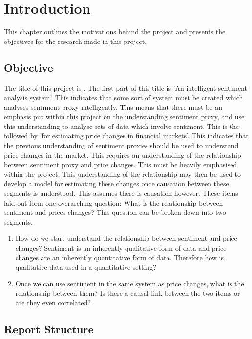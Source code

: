 
\chapter{Introduction}

This chapter outlines the motivations behind the project and presents the objectives for the research made in this project.

\section{Objective}

The title of this project is \thesistitle. The first part of this title is 'An intelligent sentiment analysis system'. This indicates that some sort of system must be created which analyses sentiment proxy intelligently. This means that there must be an emphasis put within this project on the understanding sentiment proxy, and use this understanding to analyse sets of data which involve sentiment. This is the followed by 'for estimating price changes in financial markets'. This indicates that the previous understanding of sentiment proxies should be used to understand price changes in the market. This requires an understanding of the relationship between sentiment proxy and price changes. This must be heavily emphasised within the project. This understanding of the relationship may then be used to develop a model for estimating these changes once causation between these segments is understood. This assumes there is causation however. These items laid out form one overarching question: What is the relationship between sentiment and prices changes? This question can be broken down into two segments.
\begin{enumerate}
    \item How do we start understand the relationship between sentiment and price changes? Sentiment is an inherently qualitative form of data and price changes are an inherently quantitative form of data. Therefore how is qualitative data used in a quantitative setting?
    \item Once we can use sentiment in the same system as price changes, what is the relationship between them? Is there a causal link between the two items or are they even correlated?
\end{enumerate}

\section{Report Structure}

